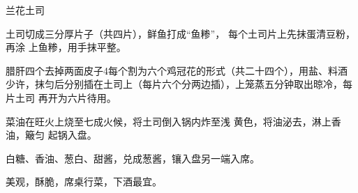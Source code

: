 \begin{recipe}{兰花土司}

\ingredients


\preparation

土司切成三分厚片子（共四片），鲜鱼打成“鱼糁”， 每个土司片上先抹蛋清豆粉，再涂
上鱼糁，用手抹平整。

\step 腊肝四个去掉两面皮子4每个割为六个鸡冠花的形式（共二十四个），用盐、料酒
少许，抹匀后分别插在土司上（每片六个分两边插），上笼蒸五分钟取出晾冷，每片土司
再开为六片待用。

菜油在旺火上烧至七成火候，将土司倒入锅内炸至浅 黄色，将油泌去，淋上香油，簸匀
起锅入盘。

\step 白糖、香油、葱白、甜酱，兑成葱酱，镶入盘另一端入席。

\features

美观，酥脆，席桌行菜，下酒最宜。

\end{recipe}

